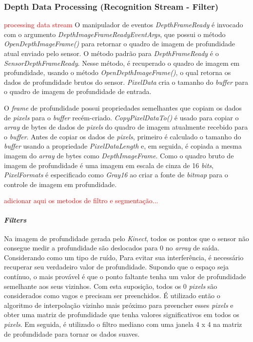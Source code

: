 \subsubsection{Depth Data Processing (Recognition Stream - Filter)}\label{sec:depthDataProcessing}
\textcolor{red}{processing data stream}
O manipulador de eventos \textit{DepthFrameReady} é invocado com o argumento \textit{DepthImageFrameReadyEventArgs}, que possui o método \textit{OpenDepthImageFrame()} para retornar o quadro de imagem de profundidade atual enviado pelo sensor. O  método padrão para \textit{DepthFrameReady} é o \textit{SensorDepthFrameReady}. Nesse método, é recuperado o quadro de imagem em profundidade, usando o método \textit{OpenDepthImageFrame()}, o qual retorna os dados de profundidade brutos do sensor. \textit{PixelData} cria o tamanho do \textit{buffer} para o quadro de imagem de profundidade de entrada.

O \textit{frame} de profundidade possui propriedades semelhantes que copiam os dados de \textit{pixels} para o \textit{buffer} recém-criado. \textit{CopyPixelDataTo()} é usado para copiar o \textit{array} de bytes de dados de \textit{pixels} do quadro de imagem atualmente recebido para o \textit{buffer}. Antes de copiar os dados de \textit{pixels}, primeiro é calculado o tamanho do \textit{buffer} usando a propriedade \textit{PixelDataLength} e, em seguida, é copiada a mesma imagem do \textit{array} de bytes como \textit{DepthImageFrame}. Como o quadro bruto de imagem de profundidade é uma imagem em escala de cinza de 16 \textit{bits}, \textit{PixelFormats} é especificado  como \textit{Gray16} ao criar a fonte de \textit{bitmap} para o controle de imagem em profundidade.

\textcolor{red}{adicionar aqui os metodos de filtro e segmentação...}

\paragraph{\textit{Filters}}\label{sec:filters}
 Na imagem de profundidade gerada pelo \textit{Kinect}, todos os pontos que o sensor não consegue medir a profundidade são deslocados para 0 no \textit{array} de saída. Considerando  como um tipo de ruído, Para evitar sua interferência, é necessário recuperar seu verdadeiro valor de profundidade. Supondo que o espaço seja contínuo, o mais provável é que o ponto faltante tenha um valor de profundidade semelhante aos seus vizinhos. Com esta suposição, todos os 0 \textit{pixels} são considerados como vagos e precisam ser preenchidos. É utilizado então o algoritmo de interpolação vizinho mais próximo para preencher esses \textit{pixels} e obter uma matriz de profundidade que tenha valores significativos em todos os \textit{pixels}. Em seguida, é utilizado o filtro mediano com uma janela 4 x 4 na matriz de profundidade para tornar os dados suaves.

